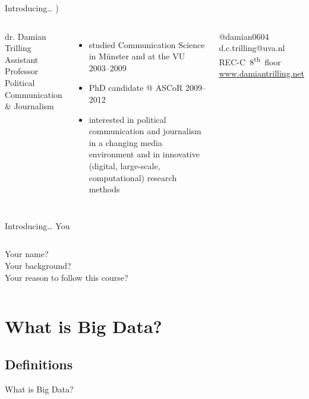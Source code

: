 \begin{frame}{Introducing\ldots}
{\huge{\right) }}
\small{}
\begin{columns}
	dr. Damian Trilling \\
	Assistant Professor Political Communication \& Journalism \\
	\begin{itemize}
		\item studied Communication Science in M\"unster and at the VU 2003--2009
		\item PhD candidate @ ASCoR 2009--2012
		\item interested in political communication and journalism in a changing media environment and in innovative (digital, large-scale, computational) research methods
	\end{itemize}
	@damian0604 ~~ d.c.trilling@uva.nl ~~ REC-C~8\textsuperscript{th}~floor ~~ \url{www.damiantrilling.net} 
\end{columns}
\end{frame}


\begin{frame}{Introducing\ldots}
	{\huge{You}}
	\small{}
	\begin{columns}
		Your name?\\
		Your background?\\
		Your reason to follow this course?
	\end{columns}
\end{frame}


\section{What is Big Data?}
\subsection{Definitions}

\begin{frame}
What is Big Data?
\end{frame}


{
\begin{frame}[plain]
\end{frame}
}


